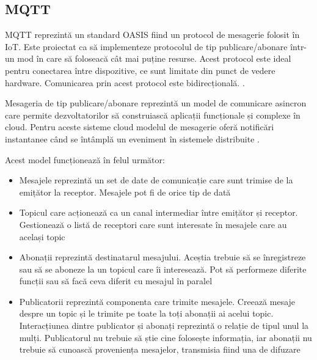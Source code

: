 \subsection{MQTT}

MQTT reprezintă un standard  OASIS fiind un protocol de mesagerie folosit în IoT. Este proiectat ca să implementeze protocolul de tip publicare/abonare într-un mod în care să foloseacă cât mai puține resurse. Acest protocol este ideal pentru conectarea între dispozitive, ce sunt limitate din punct de vedere hardware. Comunicarea prin acest protocol este bidirecțională. \cite{MQTT}.


Mesageria de tip publicare/abonare reprezintă un model de comunicare asincron care permite dezvoltatorilor să construiască aplicații funcționale și complexe în cloud. Pentru aceste sisteme cloud modelul de mesagerie oferă notificări instantanee când se întâmplă un eveniment în sistemele distribuite \cite{ps}.

Acest model funcționează în felul următor:
\begin{itemize}
	\item Mesajele reprezintă un set de date de comunicație care sunt trimise de la emițător la receptor. Mesajele pot fi de orice tip de dată \cite{ps}
	\item Topicul care acționează ca un canal intermediar între emițător și receptor. Gestionează o listă de receptori care sunt interesate în mesajele care au același topic \cite{ps}
	\item Abonații reprezintă destinatarul mesajului. Aceștia trebuie să se înregistreze sau să se aboneze la un topicul care îi interesează. Pot să performeze diferite funcții sau să facă ceva diferit cu mesajul în paralel \cite{ps}
	\item Publicatorii reprezintă componenta care trimite mesajele. Creează mesaje despre un topic și le trimite pe toate la toți abonații ai acelui topic. Interacțiunea dintre publicator și abonați reprezintă o relație de tipul unul la mulți. Publicatorul nu trebuie să știe cine folosește informația, iar abonații nu trebuie să cunoască proveniența mesajelor, transmisia fiind una de difuzare \cite{ps}
\end{itemize}

